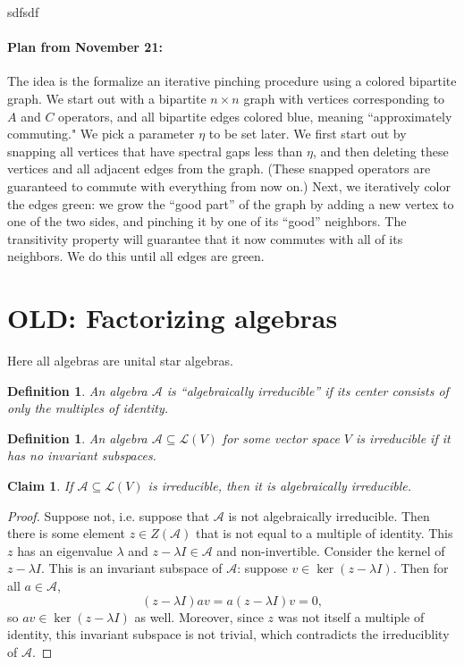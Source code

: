 \documentclass[12pt]{article}
\theoremstyle{plain}
\newtheorem{definition}[theorem]{Definition}
\newtheorem{claim}[theorem]{Claim}
\begin{document}
sdfsdf
\paragraph{Plan from November 21:}
The idea is the formalize an iterative pinching procedure using a colored bipartite graph. We start out with a bipartite $n \times n$ graph with vertices corresponding to $A$ and $C$ operators, and all bipartite edges colored blue, meaning ``approximately commuting." We pick a parameter $\eta$ to be set later. We first start out by snapping all vertices that have spectral gaps less than $\eta$, and then deleting these vertices and all adjacent edges from the graph. (These snapped operators are guaranteed to commute with everything from now on.) Next, we iteratively color the edges green: we grow the ``good part'' of the graph by adding a new vertex to one of the two sides, and pinching it by one of its ``good'' neighbors. The transitivity property will guarantee that it now commutes with all of its neighbors. We do this until all edges are green.

\newpage
\appendix
\section{OLD: Factorizing algebras}

\newcommand{\calA}{\mathcal{A}}
\newcommand{\calL}{\mathcal{L}}

Here all algebras are unital star algebras. 

\begin{definition}
    An algebra $\mathcal{A}$ is ``algebraically irreducible'' if its center consists of only the multiples of identity.
\end{definition}
\begin{definition}
    An algebra $\mathcal{A} \subseteq \mathcal{L}(V)$ for some vector space $V$ is irreducible if it has no invariant subspaces.
\end{definition}
\begin{claim}
If $\calA \subseteq \calL(V)$ is irreducible, then it is algebraically irreducible.
\end{claim}
\begin{proof}
    Suppose not, i.e. suppose that $\calA$ is not algebraically irreducible. Then there is some element $z \in Z(\calA)$ that is not equal to a multiple of identity. This $z$ has an eigenvalue $\lambda$ and $z - \lambda I \in \calA$ and non-invertible. Consider the kernel of $z - \lambda I$. This is an invariant subspace of $\calA$: suppose $v \in \ker(z -\lambda I)$. Then for all $a \in \calA$,
    \[ (z - \lambda I) a v = a (z - \lambda I)v = 0,\]
    so $av \in \ker(z - \lambda I)$ as well. Moreover, since $z$ was not itself a multiple of identity, this invariant subspace is not trivial, which contradicts the irreduciblity of $\calA$.
\end{proof}
\end{document}
